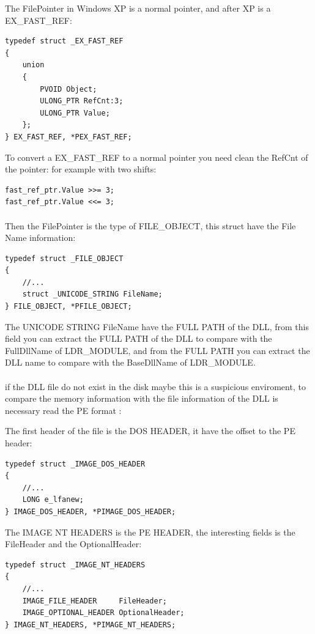 \documentclass[12pt,a4paper,english]{book}
\newcommand{\ocite}[1]{\footfullcite{#1}}
\newcommand{\paraph}{\paragraph{}}
\begin{document}
The FilePointer in Windows XP is a normal pointer, and after XP is a EX\_FAST\_REF:

\lstset{language=C,caption=EX\_FAST\_REF struct}
\begin{lstlisting}
typedef struct _EX_FAST_REF
{
    union
    {
        PVOID Object;
        ULONG_PTR RefCnt:3;
        ULONG_PTR Value;
    };
} EX_FAST_REF, *PEX_FAST_REF;
\end{lstlisting}

To convert a EX\_FAST\_REF to a normal pointer you need clean the RefCnt of the pointer: for example with two shifts:

\lstset{language=C,caption=cleaning RefCnt of a EX\_FAST\_REF pointer}
\begin{lstlisting}
fast_ref_ptr.Value >>= 3;
fast_ref_ptr.Value <<= 3;
\end{lstlisting}

\paraph{}
Then the FilePointer is the type of FILE\_OBJECT, this struct have the File Name information:

\lstset{language=C,caption=FILE\_OBJECT}
\begin{lstlisting}
typedef struct _FILE_OBJECT
{
    //...
    struct _UNICODE_STRING FileName;
} FILE_OBJECT, *PFILE_OBJECT;
\end{lstlisting}

The UNICODE STRING FileName have the FULL PATH of the DLL, from this field you can extract the FULL PATH of the DLL to compare with the FullDllName of LDR\_MODULE, and from the FULL PATH you can extract the DLL name to compare with the BaseDllName of LDR\_MODULE.

\paraph{}
if the DLL file do not exist in the disk maybe this is a suspicious enviroment, to compare the memory information with the file information of the DLL is necessary read the PE format \ocite{microsoftpecoff2010}:

The first header of the file is the DOS HEADER, it have the offset to the PE header:
\lstset{language=C,caption=IMAGE\_DOS\_HEADER structure}
\begin{lstlisting}
typedef struct _IMAGE_DOS_HEADER
{
    //...
    LONG e_lfanew;
} IMAGE_DOS_HEADER, *PIMAGE_DOS_HEADER;
\end{lstlisting}

The IMAGE NT HEADERS is the PE HEADER, the interesting fields is the FileHeader and the OptionalHeader:
\lstset{language=C,caption=IMAGE\_NT\_HEADERS structure}
\begin{lstlisting}
typedef struct _IMAGE_NT_HEADERS
{
    //...
    IMAGE_FILE_HEADER     FileHeader;
    IMAGE_OPTIONAL_HEADER OptionalHeader;
} IMAGE_NT_HEADERS, *PIMAGE_NT_HEADERS;
\end{lstlisting}
\end{document}
